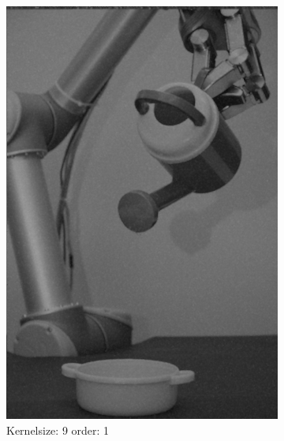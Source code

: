 \begin{figure}[H]
    
       \begin{subfigure}[b]{0.3\textwidth}
        \includegraphics[width=\textwidth]{img1/img_1_gaus_9_1.png}
        \caption{Kernelsize: 9 order: 1}
         \label{fig:img1_contra9_1}
    \end{subfigure}
    \begin{subfigure}[b]{0.3\textwidth}

\end{subfigure}
\end{figure}
